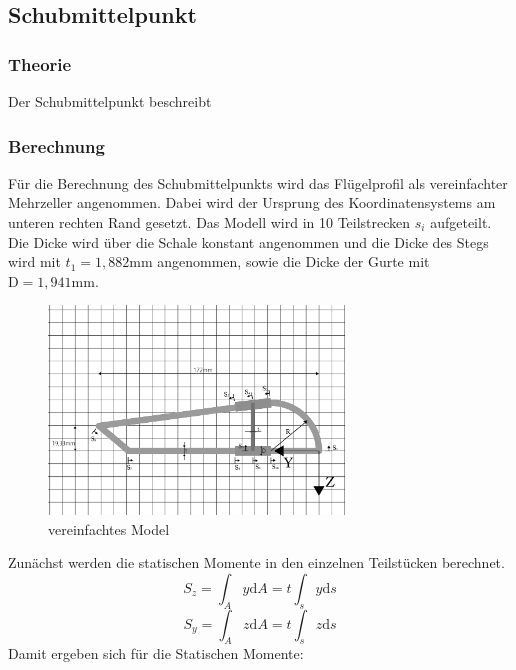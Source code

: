 
\subsection{Schubmittelpunkt}
\subsubsection{Theorie}
Der Schubmittelpunkt beschreibt
\subsubsection{Berechnung}
Für die Berechnung des Schubmittelpunkts wird das Flügelprofil als vereinfachter Mehrzeller angenommen.
Dabei wird der Ursprung des Koordinatensystems am unteren rechten Rand gesetzt. Das Modell wird in 10 Teilstrecken $s_{i}$ aufgeteilt. Die Dicke wird über die Schale konstant angenommen und die Dicke des Stegs wird mit $t_{1}=1,882\mathrm{mm}$ angenommen, sowie die Dicke der Gurte mit $\mathrm{D}=1,941\mathrm{mm}$.
\begin{figure}[h]
 \centering
 \includegraphics[width=0.7\textwidth]{Bilder/Model1}
 \caption{vereinfachtes Model}
 \label{fig:Model1}
\end{figure}

Zunächst werden die statischen Momente in den einzelnen Teilstücken berechnet.
$$ S_{z}=\int_{A}^{}y \mathrm{d}A =t\int_{s}^{}y \mathrm{d}s $$
$$ S_{y}=\int_{A}^{}z \mathrm{d}A =t\int_{s}^{}z \mathrm{d}s $$
Damit ergeben sich für die Statischen Momente:

